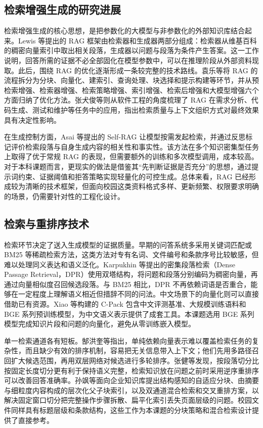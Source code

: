 \subsection{检索增强生成的研究进展}

检索增强生成的核心思想，是把参数化的大模型与非参数化的外部知识库结合起来。Lewis 等提出的 RAG 框架由检索器和生成器两部分组成：检索器从维基百科的稠密向量索引中取出相关段落，生成器以问题与段落为条件产生答案。这一工作说明，回答所需的证据不必全部固化在模型参数中，可以在推理阶段从外部资料现取。此后，围绕 RAG 的优化逐渐形成一条较完整的技术路线。袁乐等将 RAG 的流程拆分为分块、向量化、建索引、查询处理、块选择和提示构建等环节，并从预检索增强、检索器增强、检索策略增强、索引增强、检索后增强和大模型增强六个方面归纳了优化方法。张犬俊等则从软件工程的角度梳理了 RAG 在需求分析、代码生成、测试和维护等任务中的应用，指出检索质量与上下文组织方式对最终效果具有决定性影响。

在生成控制方面，Asai 等提出的 Self-RAG 让模型按需发起检索，并通过反思标记评价检索段落与自身生成内容的相关性和事实性。该方法在多个知识密集型任务上取得了优于常规 RAG 的表现，但需要额外的训练和多次模型调用，成本较高。对于本科课题而言，更现实的做法是借鉴其“先判断证据是否充分”的思想，通过提示词约束、证据阈值和拒答策略实现轻量化的可控生成。总体来看，RAG 已经形成较为清晰的技术框架，但面向校园这类资料格式多样、更新频繁、权限要求明确的场景，仍需要针对性的工程化设计。

\subsection{检索与重排序技术}

检索环节决定了送入生成模型的证据质量。早期的问答系统多采用关键词匹配或 BM25 等稀疏检索方法，这类方法对专有名词、文件编号和条款序号比较敏感，但难以处理同义表达和语义泛化。Karpukhin 等提出的密集段落检索（Dense Passage Retrieval，DPR）使用双塔结构，将问题和段落分别编码为稠密向量，再通过向量相似度召回候选段落。与 BM25 相比，DPR 不再依赖词语是否重合，能够在一定程度上理解语义相近但措辞不同的问法。中文场景下的向量化则可以直接借助已有资源。Xiao 等构建的 C-Pack 包含中文评测基准、大规模训练语料和 BGE 系列预训练模型，为中文语义表示提供了成套工具。本课题选用 BGE 系列模型完成知识片段和问题的向量化，避免从零训练嵌入模型。

单一检索通道各有短板。郜洪奎等指出，单纯依赖向量表示难以覆盖检索任务的复杂性，而且缺少有效的排序机制，容易把无关信息带入上下文；他们先用多路径召回扩大候选范围，再用双层网络对候选进行多轮排序。张健等发现，按段落切分比按固定长度切分更有利于保持语义完整，检索知识放在问题之前时采用逆序重排序可以改善回答准确率。孙飒等面向企业知识库提出结构感知的自适应分块、由摘要与细粒度内容构成的层次化父子块索引，以及双通道混合检索和交叉重排方案，以解决固定窗口切分把完整操作步骤拆散、扁平化索引丢失页面层级的问题。校园文件同样具有标题层级和条款结构，这些工作为本课题的分块策略和混合检索设计提供了直接参考。

